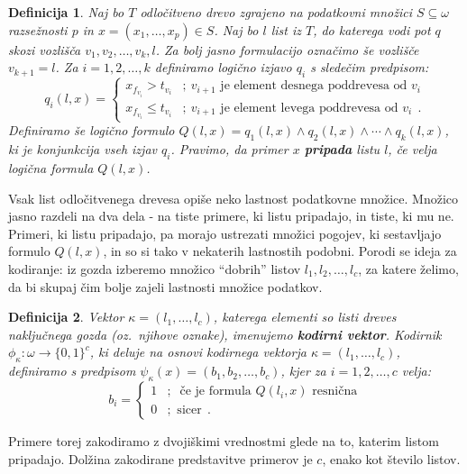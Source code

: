 \documentclass[12pt,a4paper]{article}
\newtheorem{definicija}{Definicija}
\begin{document}
\begin{definicija}
\label{def-pripadnost-listu}
Naj bo $T$ odločitveno drevo zgrajeno na podatkovni množici $S \subseteq \omega$ razsežnosti $p$ in $x=(x_1,\ldots,x_p) \in S$. 
Naj bo $l$ list iz $T$, do katerega vodi pot $q$ skozi vozlišča $v_1, v_2, \ldots, v_k, l$. 
Za bolj jasno formulacijo označimo še vozlišče $v_{k+1} = l$.
Za $i=1,2,\ldots,k$ definiramo logično izjavo $q_i$ s sledečim predpisom:
\[
q_i(l,x) =
\begin{cases}
x_{f_{v_i}} > t_{v_i} &;\ v_{i+1} \text{ je element desnega poddrevesa od } v_i \\
x_{f_{v_i}} \leq t_{v_i} &;\ v_{i+1} \text{ je element levega poddrevesa od } v_i\ \ .
\end{cases}
\]
Definiramo še logično formulo $Q(l,x)=q_1(l,x) \land q_2(l,x) \land \cdots \land q_k(l,x)$, ki je konjunkcija vseh izjav $q_i$.
Pravimo, da primer $x$ \textbf{pripada} listu $l$, če velja logična formula $Q(l,x)$.
\end{definicija}

Vsak list odločitvenega drevesa opiše neko lastnost podatkovne množice. Množico jasno razdeli na dva dela - na tiste primere, ki listu pripadajo, in tiste, ki mu ne.
Primeri, ki listu pripadajo, pa morajo ustrezati množici pogojev, ki sestavljajo formulo $Q(l,x)$, in so si tako v nekaterih lastnostih podobni. %
Porodi se ideja za kodiranje: iz gozda izberemo množico ``dobrih'' listov $l_1, l_2, \ldots, l_c$, za katere želimo, da bi skupaj čim bolje zajeli lastnosti množice podatkov.

\begin{definicija}
\label{def-kodiranje}
	Vektor $\kappa=(l_1,\ldots,l_c)$, katerega elementi so listi dreves naključnega gozda (oz.~njihove oznake), imenujemo \textbf{kodirni vektor}.
	Kodirnik $\phi_\kappa: \omega \rightarrow \{0,1\}^c$, ki deluje na osnovi kodirnega vektorja $\kappa=(l_1,\ldots, l_c)$, definiramo s predpisom $\psi_\kappa(x) = (b_1, b_2, \ldots, b_c)$, kjer za $i=1,2,\ldots,c$ velja:
	$$
	b_i = 
	\begin{cases}
	1 &;\ \text{ če je formula } Q(l_i,x) \text{ resnična} \\
	0 &; \text{ sicer}\ \ .
	\end{cases}
	$$
\end{definicija}
Primere torej zakodiramo z dvojiškimi vrednostmi glede na to, katerim listom pripadajo. Dolžina zakodirane predstavitve primerov je $c$, enako kot število listov.
\end{document}
